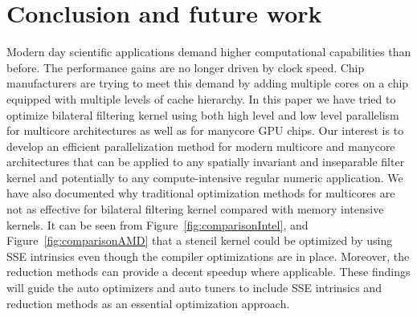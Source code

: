 \documentclass{IEEEtran}
\begin{document}
\section{Conclusion and future work}
\label{sec:conclusion} 
Modern day scientific applications demand higher computational capabilities than before. The performance gains are no longer driven by clock speed. Chip manufacturers are trying to meet this demand by adding multiple cores on a chip equipped with multiple levels of cache hierarchy. In this paper we have tried to optimize bilateral filtering kernel using both high level and low level parallelism for multicore architectures as well as for manycore GPU chips. Our interest is to develop an efficient parallelization method for modern multicore and manycore architectures that can be applied to any spatially invariant and inseparable filter kernel and potentially to any compute-intensive regular numeric application. We have also documented why traditional optimization methods for multicores are not as effective for bilateral filtering kernel compared with memory intensive kernels. It can be seen from Figure~\ref{fig:comparisonIntel}, and Figure~\ref{fig:comparisonAMD} that a stencil kernel could be optimized by using SSE intrinsics even though the compiler optimizations are in place. Moreover, the reduction methods can provide a decent speedup where applicable. These findings will guide the auto optimizers and auto tuners to include SSE intrinsics and reduction methods as an essential optimization approach.

  
\end{document}

